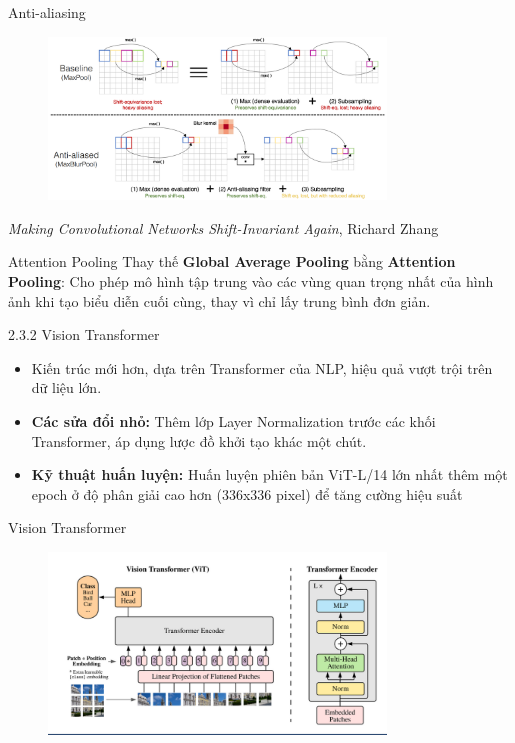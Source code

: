 \begin{frame}{Anti-aliasing}
    \begin{figure}[H]
        \centering
        \includegraphics[width=0.8\textwidth]{img/01-anti_aliasing.png}
        \label{fig:skip_connection}
    \end{figure}

    \centering
    \begin{small}
        \textit{Making Convolutional Networks Shift-Invariant Again}, Richard Zhang
    \end{small} 
\end{frame}

\begin{frame}{Attention Pooling}
    Thay thế \textbf{Global Average Pooling} bằng \textbf{Attention Pooling}: Cho phép mô hình tập trung vào các vùng quan trọng nhất của hình ảnh khi tạo biểu diễn cuối cùng, thay vì chỉ lấy trung bình đơn giản.
\end{frame}

\begin{frame}{2.3.2 Vision Transformer}
    \begin{itemize}
        \item Kiến trúc mới hơn, dựa trên Transformer của NLP, hiệu quả vượt trội trên dữ liệu lớn.
        \item \textbf{Các sửa đổi nhỏ:} Thêm lớp Layer Normalization trước các khối Transformer, áp dụng lược đồ khởi tạo khác một chút.
        \item \textbf{Kỹ thuật huấn luyện:} Huấn luyện phiên bản ViT-L/14 lớn nhất thêm một epoch ở độ phân giải cao hơn (336x336 pixel) để tăng cường hiệu suất
    \end{itemize}
\end{frame}

\begin{frame}{Vision Transformer}
    \begin{figure}[H]
        \centering
        \includegraphics[width=0.8\textwidth]{img/01-transformer.png}
    \end{figure}
\end{frame}

